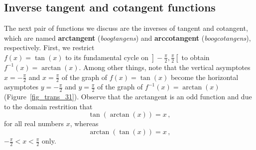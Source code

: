 \subsection{Inverse tangent and cotangent functions}
\ifcourse
	\checkoddpage
{}
 \fi
The next pair of functions we  discuss are the inverses of tangent and cotangent, which are named \textbf{arctangent} (\textit{boogtangens}) and \textbf{arccotangent} (\textit{boogcotangens}), respectively.  First, we restrict \\ $f(x) = \tan(x)$ to its fundamental cycle on $\left.\right]-\frac{\pi}{2}, \frac{\pi}{2}\left[\right.$ to obtain $f^{-1}(x) = \arctan(x)$. Among other things, note that the vertical asymptotes $x = -\frac{\pi}{2}$ and $x = \frac{\pi}{2}$ of the graph of $f(x) = \tan(x)$ become the horizontal asymptotes $y = -\frac{\pi}{2}$ and $y = \frac{\pi}{2}$ of the graph of $f^{-1}(x) = \arctan(x)$ (Figure~\ref{fig_trans_31}).   Observe that the arctangent is an odd function and due to the domain restrition that  $$\tan\left(\arctan(x)\right) = x\,,$$
for all real numbers $x$, whereas $$\arctan(\tan(x)) = x\,,$$ $-\frac{\pi}{2} < x < \frac{\pi}{2}$ only. 

